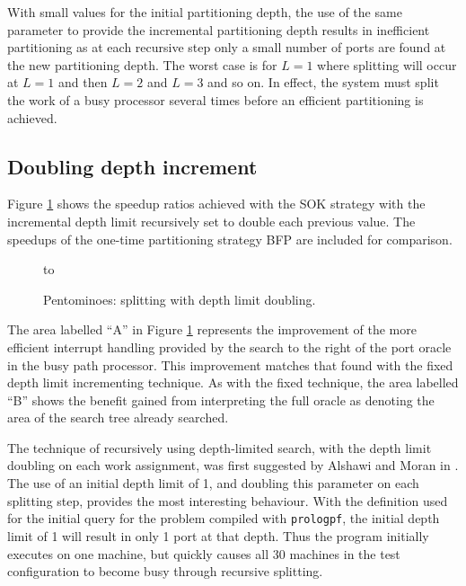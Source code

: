 With small values for the initial partitioning depth,
the use of the same parameter to provide the incremental partitioning depth
results in inefficient partitioning as at each recursive step only a small number
of ports are found at the new partitioning depth.  The worst case is for $L=1$
where splitting will occur at $L=1$ and then $L=2$ and $L=3$ and so on.  In effect,
the system must split the work of a busy processor several times before an
efficient partitioning is achieved.

\subsection{Doubling depth increment}
\enlargethispage{-\baselineskip}  %

Figure \ref{spd_compare_doubling} shows the speedup ratios achieved with the
SOK strategy with the incremental depth limit recursively set to
double each previous value. The speedups of the 
one-time partitioning strategy BFP are included for
comparison.

\begin{figure}[htb]
\vspace{15mm} \hbox to 
\caption{Pentominoes: splitting with depth limit doubling.}
\vspace{5mm}
\label{spd_compare_doubling}
\end{figure}

The area labelled ``A'' in Figure \ref{spd_compare_doubling} 
represents the improvement of the more efficient
interrupt handling provided by the search to the right of the port oracle in the
busy path processor.  This improvement matches that found with the fixed depth
limit incrementing technique.  As with the fixed technique, the area labelled
``B'' shows the benefit gained from interpreting the full oracle as denoting
the area of the search tree already searched.

The technique of recursively using depth-limited search, with the depth
limit doubling on each work assignment, was first suggested by Alshawi and
Moran in \cite{AM88}.
The use of an initial depth limit of 1, and doubling this parameter on each
splitting step, provides the most interesting behaviour.  With the definition used
for the initial query for the problem compiled with \texttt{prologpf},
the initial depth limit
of 1 will result in only 1 port at that depth.  Thus the program initially 
executes on one machine, but quickly causes all 30 machines in the test configuration
to become busy through recursive splitting.

